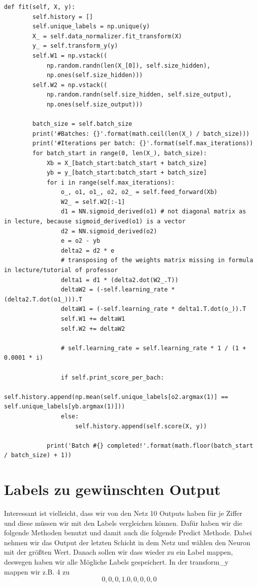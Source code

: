 \begin{lstlisting}[style=py]
        def fit(self, X, y):
        self.history = []
        self.unique_labels = np.unique(y)
        X_ = self.data_normalizer.fit_transform(X)
        y_ = self.transform_y(y)
        self.W1 = np.vstack((
            np.random.randn(len(X_[0]), self.size_hidden),
            np.ones(self.size_hidden)))
        self.W2 = np.vstack((
            np.random.randn(self.size_hidden, self.size_output),
            np.ones(self.size_output)))

        batch_size = self.batch_size
        print('#Batches: {}'.format(math.ceil(len(X_) / batch_size)))
        print('#Iterations per batch: {}'.format(self.max_iterations))
        for batch_start in range(0, len(X_), batch_size):
            Xb = X_[batch_start:batch_start + batch_size]
            yb = y_[batch_start:batch_start + batch_size]
            for i in range(self.max_iterations):
                o_, o1, o1_, o2, o2_ = self.feed_forward(Xb)
                W2_ = self.W2[:-1]
                d1 = NN.sigmoid_derived(o1) # not diagonal matrix as in lecture, because sigmoid_derived(o1) is a vector
                d2 = NN.sigmoid_derived(o2)
                e = o2 - yb
                delta2 = d2 * e
                # transposing of the weights matrix missing in formula in lecture/tutorial of professor
                delta1 = d1 * (delta2.dot(W2_.T))
                deltaW2 = (-self.learning_rate * (delta2.T.dot(o1_))).T
                deltaW1 = (-self.learning_rate * delta1.T.dot(o_)).T
                self.W1 += deltaW1
                self.W2 += deltaW2

                # self.learning_rate = self.learning_rate * 1 / (1 + 0.0001 * i)

                if self.print_score_per_bach:
                    self.history.append(np.mean(self.unique_labels[o2.argmax(1)] == self.unique_labels[yb.argmax(1)]))
                else:
                    self.history.append(self.score(X, y))

            print('Batch #{} completed!'.format(math.floor(batch_start / batch_size) + 1))
\end{lstlisting}

\section*{Labels zu gewünschten Output}
Interessant ist vielleicht, dass wir von den Netz 10 Outputs haben für je Ziffer und diese müssen wir mit den
Labels vergleichen können. Dafür haben wir die folgende Methoden benutzt und damit auch die folgende Predict Methode.
Dabei nehmen wir das Output der letzten Schicht in dem Netz und wählen den Neuron mit der größten Wert. Danach
sollen wir dass wieder zu ein Label mappen, deswegen haben wir alle Mögliche Labels gespeichert.
In der transform\_y mappen wir z.B. 4 zu \[0,0,0,1.0,0,0,0,0\]

